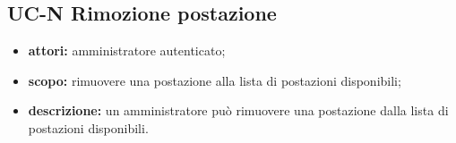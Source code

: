 \subsection{UC-N Rimozione postazione}
\begin{itemize}
    \item \textbf{attori:} amministratore autenticato;
    \item \textbf{scopo:} rimuovere una postazione alla lista di postazioni disponibili;
    \item \textbf{descrizione:} un amministratore pu\`{o} rimuovere una postazione dalla lista di postazioni disponibili.
\end{itemize}
